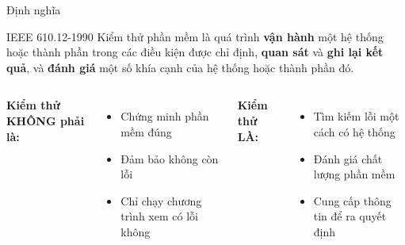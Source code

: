 \documentclass[aspectratio=169,12pt]{beamer}
\begin{document}
\begin{frame}{Định nghĩa}
  \begin{block}{IEEE 610.12-1990 \cite{ieee610}}
    Kiểm thử phần mềm là quá trình \textbf{vận hành} một hệ thống hoặc thành phần
    trong các điều kiện được chỉ định, \textbf{quan sát} và \textbf{ghi lại kết quả},
    và \textbf{đánh giá} một số khía cạnh của hệ thống hoặc thành phần đó.
  \end{block}

  \vspace{0.8em}
  \begin{columns}
    \textbf{Kiểm thử KHÔNG phải là:}
    \begin{itemize}
      \item Chứng minh phần mềm đúng
      \item Đảm bảo không còn lỗi
      \item Chỉ chạy chương trình xem có lỗi không
    \end{itemize}

    \textbf{Kiểm thử LÀ:}
    \begin{itemize}
      \item Tìm kiếm lỗi một cách có hệ thống
      \item Đánh giá chất lượng phần mềm
      \item Cung cấp thông tin để ra quyết định
    \end{itemize}
  \end{columns}
\end{frame}
\end{document}
